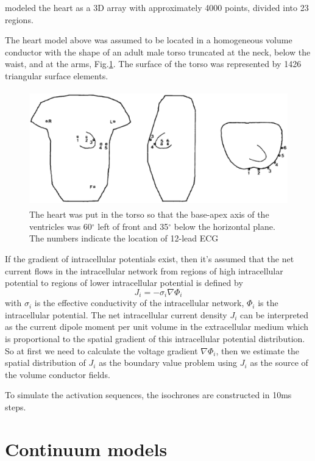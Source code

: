 \citep{Miller1978} modeled the heart as a 3D array with approximately 4000
points, divided into 23 regions.

The heart model above was assumed to be located in a homogeneous volume
conductor with the shape of an adult male torso truncated at the neck, below the
waist, and at the arms, Fig.\ref{fig:cardiac_torso_Miller1978}. The surface of
the torso was represented by 1426 triangular surface elements.

\begin{figure}[hbt]
  \centerline{\includegraphics[height=5cm,
    angle=0]{./images/cardiac_torso_Miller1978.eps}}
  \caption{The heart was put in the torso so that the base-apex axis of the
  ventricles was 60$^\circ$ left of front and 35$^\circ$ below the horizontal
  plane. The numbers indicate the location of 12-lead ECG}
  \label{fig:cardiac_torso_Miller1978}
\end{figure}

If the gradient of intracellular potentials exist, then it's assumed that the 
net current flows in the intracellular network from regions of high
intracellular potential to regions of lower intracellular potential is defined
by
\begin{equation}
J_i = -\sigma_i \nabla \Phi_i
\end{equation}
with $\sigma_i$ is the effective conductivity of the intracellular network,
$\Phi_i$ is the intracellular potential. The net intracellular current
density $J_i$ can be interpreted as the current dipole moment per unit
volume in the extracellular medium which is proportional to the spatial
gradient of this intracellular potential distribution. So at first we need to
calculate the voltage gradient $\nabla \Phi_i$, then we estimate the spatial
distribution of $J_i$ as the boundary value problem using $J_i$ as the source of
the volume conductor fields.

To simulate the activation sequences, the isochrones are constructed in 10ms
steps.


\section{Continuum models}
\label{sec:continuous-models}

